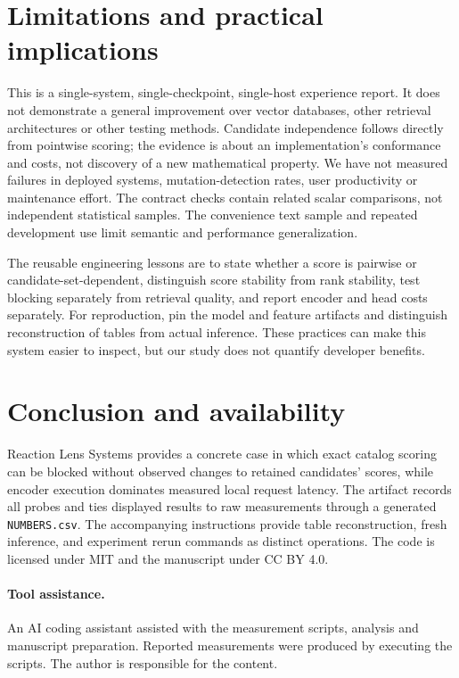 \documentclass[11pt,a4paper]{article}
\begin{document}
\section{Limitations and practical implications}
This is a single-system, single-checkpoint, single-host experience report. It does
not demonstrate a general improvement over vector databases, other retrieval
architectures or other testing methods. Candidate independence follows directly
from pointwise scoring; the evidence is about an implementation's conformance and
costs, not discovery of a new mathematical property. We have not measured failures
in deployed systems, mutation-detection rates, user productivity or maintenance
effort. The contract checks contain related scalar comparisons, not independent
statistical samples. The convenience text sample and repeated development use
limit semantic and performance generalization.

The reusable engineering lessons are to state whether a score is pairwise or
candidate-set-dependent, distinguish score stability from rank stability, test
blocking separately from retrieval quality, and report encoder and head costs
separately. For reproduction, pin the model and feature artifacts and distinguish
reconstruction of tables from actual inference. These practices can make this
system easier to inspect, but our study does not quantify developer benefits.

\section{Conclusion and availability}
Reaction Lens Systems provides a concrete case in which exact catalog scoring can be
blocked without observed changes to retained candidates' scores, while encoder
execution dominates measured local request latency. The artifact records all
probes and ties displayed results to raw measurements through a generated
\texttt{NUMBERS.csv}. The accompanying instructions provide table reconstruction,
fresh inference, and experiment rerun commands as distinct operations.
The code is licensed under MIT and the manuscript under CC BY 4.0.

\paragraph{Tool assistance.} An AI coding assistant assisted with the measurement
scripts, analysis and manuscript preparation. Reported measurements were produced
by executing the scripts. The author is responsible for the content.

{\small
\setlength{\bibsep}{3pt}

}
\end{document}

